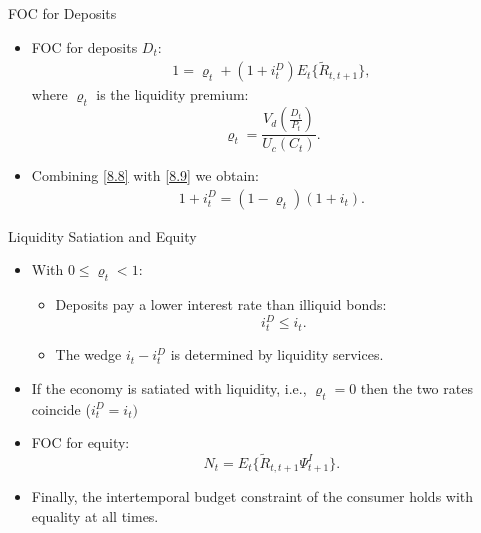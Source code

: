 \documentclass[11pt,aspectratio=169]{beamer}
\begin{document}
\begin{frame}{FOC for Deposits}
  \begin{itemize}
    \item FOC for deposits $D_t$:
    \begin{align}
        1
      = \varrho_t
        + (1+i_t^D) E_t\{\tilde{R}_{t,t+1}\}, \label{8.9}
    \end{align}
    where $\varrho_t$ is the liquidity premium: $$\varrho_t
      = \frac{V_d(\frac{D_t}{P_t})}{U_c(C_t)}.$$
    \item Combining \eqref{8.8} with \eqref{8.9}
    we obtain:
    \begin{align}
        1+i_t^D = (1-\varrho_t)(1+i_t). \label{8.9.5}
    \end{align}
  \end{itemize}
\end{frame}

\begin{frame}{Liquidity Satiation and Equity}
  \begin{itemize}
    \item With $0 \le \varrho_t < 1$:
    \begin{itemize}
      \item Deposits pay a lower interest rate than illiquid bonds:
      $$i_t^D \le i_t.$$
      \item The wedge $i_t - i_t^D$ is determined by liquidity services.
    \end{itemize}
    \item If the economy is satiated with liquidity, i.e., $\varrho_t = 0$ then the two rates coincide ($i_t^D = i_t)$
    \item FOC for equity:
    $$N_t = E_t\{\tilde{R}_{t,t+1} \Psi_{t+1}^I\}.$$
    \item Finally, the intertemporal budget constraint of the consumer holds with equality at all times.
  \end{itemize}
\end{frame}
\end{document}
